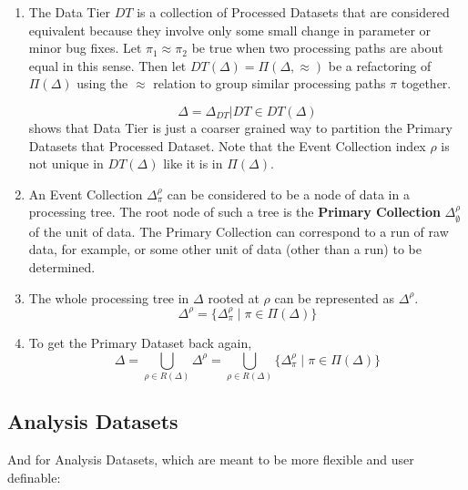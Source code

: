 \documentclass{cmspaper}
\begin{document}
{\begin{enumerate}
\item The Data Tier $DT$ is a collection of Processed Datasets that are 
      considered equivalent because they involve only some small change 
      in parameter or minor bug fixes.  Let $\pi_1 \approx \pi_2$ be 
      true when two processing paths are about equal in this sense. 
      Then let $DT(\Delta) = \Pi(\Delta,\approx)$ be a refactoring of 
      $\Pi(\Delta)$ using the $\approx$ relation to group similar 
      processing paths $\pi$ together.  

\begin{equation}
\Delta = {\Delta_{DT} | DT \in DT(\Delta)}
\end{equation}
shows that Data Tier is just a coarser grained way to partition the 
Primary Datasets that Processed Dataset.  Note that the Event Collection 
index $\rho$ is not unique in $DT(\Delta)$ like it is in $\Pi(\Delta)$.

\item An Event Collection $\Delta_{\pi}^{\rho}$ can be considered to be 
      a node of data in a processing tree. The root node of such a tree is 
      the {\bf Primary Collection} $\Delta_{\emptyset}^{\rho}$ of the 
      unit of data.  The Primary Collection can correspond to a run of 
      raw data, for example, or some other unit of data (other than a run) 
      to be determined.  

\item The whole processing tree in $\Delta$ rooted at $\rho$ can be 
      represented as $\Delta^{\rho}$. 
\begin{equation}
\Delta^{\rho} = \{ \Delta_{\pi}^{\rho} \mid \pi \in \Pi(\Delta) \}
\end{equation}

\item To get the Primary Dataset back again, 
\begin{equation}
\Delta = \bigcup_{\rho \in R(\Delta)} \Delta^{\rho} = \bigcup_{\rho \in R(\Delta)} \{ \Delta_{\pi}^{\rho} \mid \pi \in \Pi(\Delta) \} 
\end{equation}

\end{enumerate}


\subsection{Analysis Datasets}

And for Analysis Datasets, which are meant to be more flexible and user definable: 

}
\end{document}

